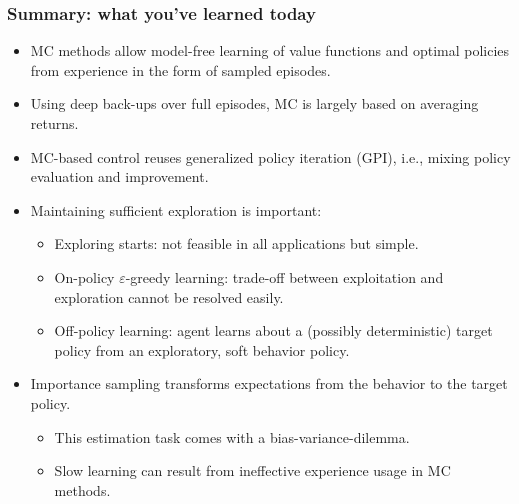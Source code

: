 
\begin{frame}
	\frametitle{Summary: what you've learned today}
	\begin{itemize}
		\item MC methods allow model-free learning of value functions and optimal policies from experience in the form of sampled episodes. \pause
		\item Using deep back-ups over full episodes, MC is largely based on averaging returns. \pause
		\item MC-based control reuses generalized policy iteration (GPI), i.e., mixing policy evaluation and improvement. \pause
		\item Maintaining sufficient exploration is important:
		      \begin{itemize}
			      \item Exploring starts: not feasible in all applications but simple. \pause
			      \item On-policy $\varepsilon$-greedy learning: trade-off between exploitation and exploration cannot be resolved easily. \pause
			      \item Off-policy learning: agent learns about a (possibly deterministic) target policy from an exploratory, soft behavior policy.
		      \end{itemize}\pause
		\item Importance sampling transforms expectations from the behavior to the target policy.
		      \begin{itemize}
			      \item This estimation task comes with a bias-variance-dilemma.  \pause
			      \item Slow learning can result from ineffective experience usage in MC methods.
		      \end{itemize}
	\end{itemize}
\end{frame}
